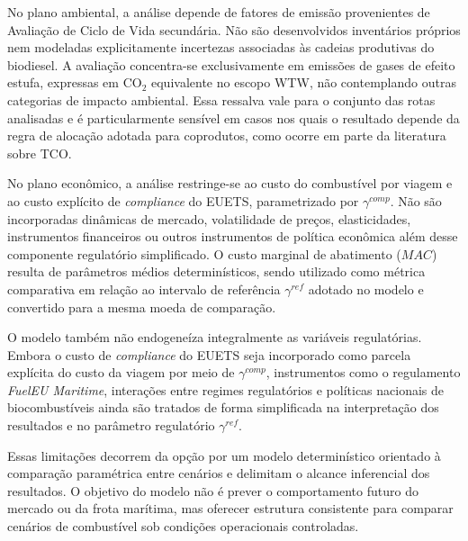 No plano ambiental, a análise depende de fatores de emissão provenientes de Avaliação de Ciclo de Vida secundária. Não são desenvolvidos inventários próprios nem modeladas explicitamente incertezas associadas às cadeias produtivas do biodiesel. A avaliação concentra-se exclusivamente em emissões de gases de efeito estufa, expressas em CO$_2$ equivalente no escopo \gls{WTW}, não contemplando outras categorias de impacto ambiental. Essa ressalva vale para o conjunto das rotas analisadas e é particularmente sensível em casos nos quais o resultado depende da regra de alocação adotada para coprodutos, como ocorre em parte da literatura sobre \gls{TCO}.

No plano econômico, a análise restringe-se ao custo do combustível por viagem e ao custo explícito de \emph{compliance} do \gls{EUETS}, parametrizado por $\gamma^{comp}$. Não são incorporadas dinâmicas de mercado, volatilidade de preços, elasticidades, instrumentos financeiros ou outros instrumentos de política econômica além desse componente regulatório simplificado. O custo marginal de abatimento ($MAC$) resulta de parâmetros médios determinísticos, sendo utilizado como métrica comparativa em relação ao intervalo de referência $\gamma^{ref}$ adotado no modelo e convertido para a mesma moeda de comparação.

O modelo também não endogeneíza integralmente as variáveis regulatórias. Embora o custo de \emph{compliance} do \gls{EUETS} seja incorporado como parcela explícita do custo da viagem por meio de $\gamma^{comp}$, instrumentos como o regulamento \emph{FuelEU Maritime}, interações entre regimes regulatórios e políticas nacionais de biocombustíveis ainda são tratados de forma simplificada na interpretação dos resultados e no parâmetro regulatório $\gamma^{ref}$.

Essas limitações decorrem da opção por um modelo determinístico orientado à comparação paramétrica entre cenários e delimitam o alcance inferencial dos resultados. O objetivo do modelo não é prever o comportamento futuro do mercado ou da frota marítima, mas oferecer estrutura consistente para comparar cenários de combustível sob condições operacionais controladas.
